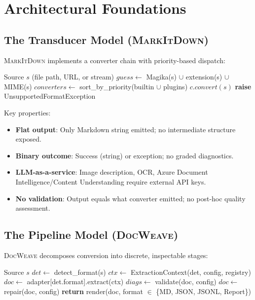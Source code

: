 \documentclass[10pt, conference, compsocconf]{IEEEtran}
\theoremstyle{plain}
\newcommand{\docweave}{\textsc{DocWeave}}
\newcommand{\markitdown}{\textsc{MarkItDown}}
\begin{document}
\section{Architectural Foundations}
\label{sec:arch}

\subsection{The Transducer Model (\markitdown{})}
\label{sec:transducer}

\markitdown{} implements a converter chain with priority-based dispatch:

\begin{algorithm}[H]
\caption{\markitdown{} Conversion}
\begin{algorithmic}
\Require Source $s$ (file path, URL, or stream)
\State $guess \gets$ Magika(s) $\cup$ extension(s) $\cup$ MIME(s)
\State $converters \gets$ sort\_by\_priority(builtin $\cup$ plugins)
        \State \Return $c.convert(s)$
    \EndIf
\EndFor
\State \textbf{raise} UnsupportedFormatException
\end{algorithmic}
\end{algorithm}

Key properties:
\begin{itemize}
    \item \textbf{Flat output}: Only Markdown string emitted; no intermediate structure exposed.
    \item \textbf{Binary outcome}: Success (string) or exception; no graded diagnostics.
    \item \textbf{LLM-as-a-service}: Image description, OCR, Azure Document Intelligence/Content Understanding require external API keys.
    \item \textbf{No validation}: Output equals what converter emitted; no post-hoc quality assessment.
\end{itemize}

\subsection{The Pipeline Model (\docweave{})}
\label{sec:pipeline}

\docweave{} decomposes conversion into discrete, inspectable stages:

\begin{algorithm}[H]
\caption{\docweave{} Conversion}
\begin{algorithmic}
\Require Source $s$
\State $det \gets$ detect\_format(s) 
\State $ctx \gets$ ExtractionContext(det, config, registry)
\State $doc \gets$ adapter[det.format].extract(ctx) 
\State $diags \gets$ validate(doc, config) 
    \State $doc \gets$ repair(doc, config) 
\EndIf
\State \textbf{return} render(doc, format $\in$ \{MD, JSON, JSONL, Report\})
\end{algorithmic}
\end{algorithm}
\end{document}
